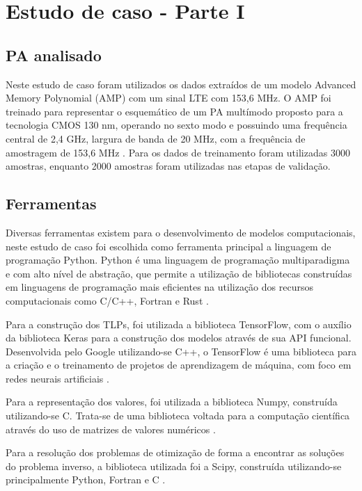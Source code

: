 \chapter{Estudo de caso - Parte I} \label{cha:estudoi}
\section{PA analisado} \label{sec:estudoi-pa}
Neste estudo de caso foram utilizados os dados extraídos de um modelo Advanced Memory Polynomial (AMP) com um sinal LTE com 153,6 MHz. O AMP foi treinado para representar o esquemático de um PA multímodo proposto para a tecnologia CMOS 130 nm, operando no sexto modo e possuindo uma frequência central de 2,4 GHz, largura de banda de 20 MHz, com a frequência de amostragem de 153,6 MHz \cite{dos2017fully} \cite{schuartz2019reduced}. Para os dados de treinamento foram utilizadas 3000 amostras, enquanto 2000 amostras foram utilizadas nas etapas de validação.

\section{Ferramentas} \label{sec:estudoi-ferr}
Diversas ferramentas existem para o desenvolvimento de modelos computacionais, neste estudo de caso foi escolhida como ferramenta principal a linguagem de programação Python. Python é uma linguagem de programação multiparadigma e com alto nível de abstração, que permite a utilização de bibliotecas construídas em linguagens de programação mais eficientes na utilização dos recursos computacionais como C/C++, Fortran e Rust \cite{Ramalho2022-zg}.

Para a construção dos TLPs, foi utilizada a biblioteca TensorFlow, com o auxílio da biblioteca Keras para a construção dos modelos através de sua API funcional. Desenvolvida pelo Google utilizando-se C++, o TensorFlow é uma biblioteca para a criação e o treinamento de projetos de aprendizagem de máquina, com foco em redes neurais artificiais \cite{tensorflow2015-whitepaper}.

Para a representação dos valores, foi utilizada a biblioteca Numpy, construída utilizando-se C. Trata-se de uma biblioteca voltada para a computação científica através do uso de matrizes de valores numéricos \cite{harris2020array}.

Para a resolução dos problemas de otimização de forma a encontrar as soluções do problema inverso, a biblioteca utilizada foi a Scipy, construída utilizando-se principalmente Python, Fortran e C \cite{2020SciPy-NMeth}.

